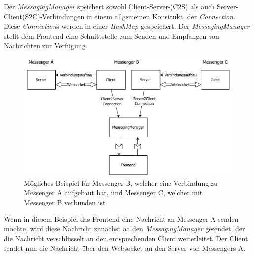 \documentclass[a4paper,ngerman, headheight=28pt,12pt]{scrartcl}
\begin{document}
Der \textit{MessagingManager} speichert sowohl Client-Server-(C2S) als auch Server-Client(S2C)-Verbindungen in einem allgemeinen Konstrukt, der \textit{Connection}. Diese \textit{Connection}s werden in einer \textit{HashMap} gespeichert. Der \textit{MessagingManager} stellt dem Frontend eine Schnittstelle zum Senden und Empfangen von Nachrichten zur Verfügung.
\begin{figure}[ht]
  \centering
  \includegraphics[width=\textwidth]{diagrams/messaging_messenger.pdf}
  \caption{Mögliches Beispiel für Messenger B, welcher eine Verbindung zu Messenger A aufgebaut hat, und Messenger C, welcher mit Messenger B verbunden ist \label{fig:MessagingMessenger}}
\end{figure}
Wenn in diesem Beispiel das Frontend eine Nachricht an Messenger A senden möchte, wird diese Nachricht zunächst an den \textit{MessagingManager} gesendet, der die Nachricht verschlüsselt an den entsprechenden Client weiterleitet. Der Client sendet nun die Nachricht über den Websocket an den Server von Messengers A.
\end{document}
